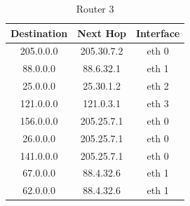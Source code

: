 \documentclass{WeSTassignment}
\begin{document}
\begin{table}[h]
\centering
\caption{Router 3}
\label{Router 3}
\begin{tabular}{ccc}
\hline
\multicolumn{1}{|c|}{\textbf{Destination}} & \multicolumn{1}{c|}{\textbf{Next Hop}} & \multicolumn{1}{c|}{\textbf{Interface}} \\ \hline
205.0.0.0                                  & 205.30.7.2                             & eth 0                                   \\
88.0.0.0                                   & 88.6.32.1                              & eth 1                                   \\
25.0.0.0                                   & 25.30.1.2                              & eth 2                                   \\
121.0.0.0                                  & 121.0.3.1                              & eth 3                                   \\
156.0.0.0                                  & 205.25.7.1                             & eth 0                                   \\
26.0.0.0                                   & 205.25.7.1                             & eth 0                                   \\
141.0.0.0                                  & 205.25.7.1                             & eth 0                                   \\
67.0.0.0                                   & 88.4.32.6                              & eth 1                                   \\
62.0.0.0                                   & 88.4.32.6                              & eth 1                                  
\end{tabular}
\end{table} \\
\end{document}
